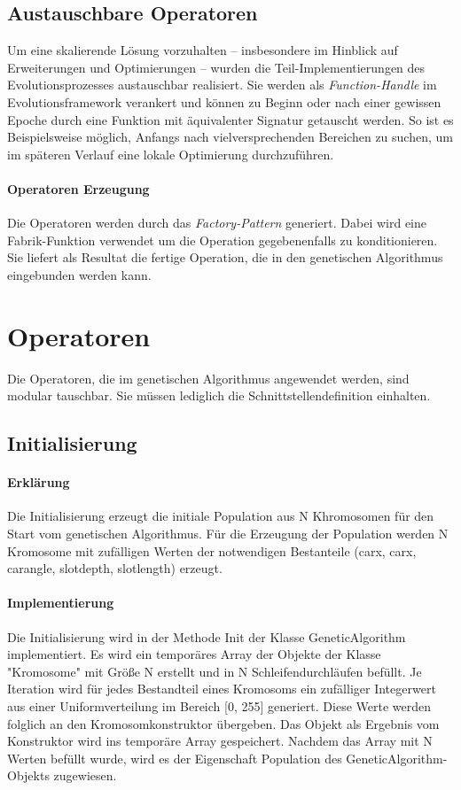 \documentclass[12pt,a4paper]{scrartcl}
\begin{document}
\subsection{Austauschbare Operatoren}\label{sec:op}
Um eine skalierende Lösung vorzuhalten -- insbesondere im Hinblick auf Erweiterungen und Optimierungen -- wurden die Teil-Implementierungen des Evolutionsprozesses austauschbar realisiert. Sie werden als \emph{Function-Handle} im Evolutionsframework verankert und können zu Beginn oder nach einer gewissen Epoche durch eine Funktion mit äquivalenter Signatur getauscht werden. So ist es Beispielsweise möglich, Anfangs nach vielversprechenden Bereichen zu suchen, um im späteren Verlauf eine lokale Optimierung durchzuführen.

\paragraph{Operatoren Erzeugung} Die Operatoren werden durch das \emph{Factory-Pattern} generiert. Dabei wird eine Fabrik-Funktion verwendet um die Operation gegebenenfalls zu konditionieren. Sie liefert als Resultat die fertige Operation, die in den genetischen Algorithmus eingebunden werden kann.

\section{Operatoren}
Die Operatoren, die im genetischen Algorithmus angewendet werden, sind modular tauschbar. Sie müssen lediglich die Schnittstellendefinition einhalten.

\subsection{Initialisierung}
\paragraph{Erklärung}
Die Initialisierung erzeugt die initiale Population aus N Khromosomen für den Start vom genetischen Algorithmus. Für die Erzeugung der Population werden N Kromosome mit zufälligen Werten der notwendigen Bestanteile (carx, carx, carangle, slotdepth, slotlength) erzeugt. 

\paragraph{Implementierung}
Die Initialisierung wird in der Methode Init der Klasse GeneticAlgorithm implementiert. Es wird ein temporäres Array der Objekte der Klasse "Kromosome" mit Größe N erstellt und in N Schleifendurchläufen befüllt. Je Iteration wird für jedes Bestandteil eines Kromosoms ein zufälliger Integerwert aus einer Uniformverteilung im Bereich [0, 255] generiert. Diese Werte werden folglich an den Kromosomkonstruktor übergeben. Das Objekt als Ergebnis vom Konstruktor wird ins temporäre Array gespeichert. Nachdem das Array mit N Werten befüllt wurde, wird es der Eigenschaft Population des GeneticAlgorithm-Objekts zugewiesen.
\end{document}

